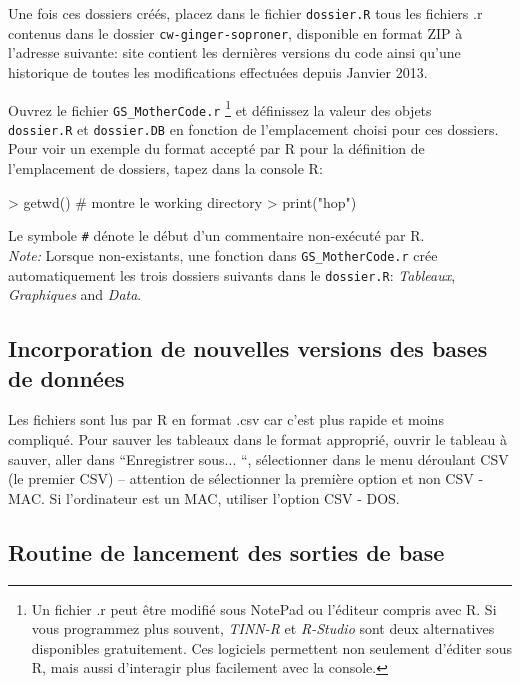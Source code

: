 \documentclass{article}
\begin{document}
     Une fois ces dossiers créés, placez dans le fichier
     \texttt{dossier.R} tous les fichiers .r contenus dans le dossier
     \texttt{cw-ginger-soproner}, disponible en format ZIP à l'adresse
     suivante:
     site contient les dernières versions du code ainsi qu'une
     historique de toutes les modifications effectuées depuis Janvier 2013.

Ouvrez le fichier \texttt{GS\_MotherCode.r} \footnote{Un fichier .r
  peut être modifié sous NotePad ou l'éditeur
compris avec R. Si vous programmez plus souvent, \emph{TINN-R} et \emph{R-Studio}
sont deux alternatives disponibles gratuitement. Ces logiciels
permettent non seulement
d'éditer sous R, mais aussi d'interagir plus facilement avec la
console. } et définissez la valeur des objets \\ \texttt{dossier.R} et \texttt{dossier.DB}
en fonction de l'emplacement choisi pour ces dossiers.
Pour voir un exemple du format accepté par R pour la
  définition de l'emplacement de dossiers, tapez dans la console R:
\begin{Schunk}
\begin{Sinput}
> getwd() # montre le working directory
> print("hop")
\end{Sinput}
\end{Schunk}
  \noindent Le symbole \texttt{\#} dénote le début d'un commentaire non-exécuté
par R.\\


\noindent \emph{Note:} Lorsque non-existants, une fonction dans \texttt{GS\_MotherCode.r} crée
automatiquement les trois dossiers
suivants dans le \texttt{dossier.R}: \emph{Tableaux},
\emph{Graphiques} and \emph{Data}. \\


\subsection*{Incorporation de nouvelles versions des bases de données}
\label{nouvdb}
Les fichiers sont lus par R en format .csv car c'est plus rapide et
moins compliqué. Pour sauver les tableaux dans le format approprié,
ouvrir le tableau à sauver, aller dans ``Enregistrer sous... ``,
sélectionner dans le menu déroulant CSV (le premier CSV) -- attention
de sélectionner la première option et non CSV - MAC. Si l'ordinateur
est un MAC, utiliser l'option CSV - DOS.

   \subsection*{Routine de lancement des sorties de base}
\end{document}
